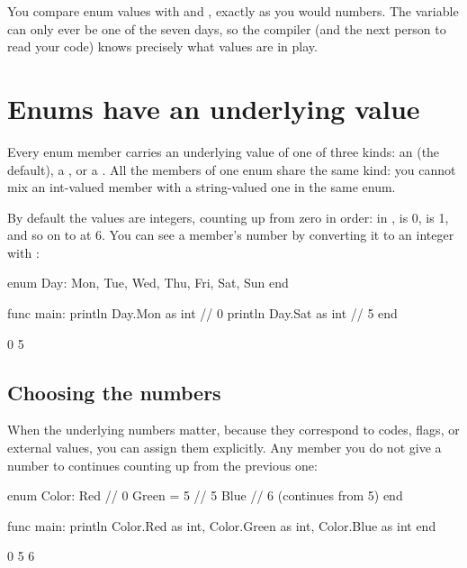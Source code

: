 You compare enum values with \code{==} and \code{!=}, exactly as you would
numbers. The variable  can only ever be one of the seven days, so the
compiler (and the next person to read your code) knows precisely what values
are in play.

\section{Enums have an underlying value}

Every enum member carries an underlying value of one of three kinds: an
 (the default), a , or a . All the members of
one enum share the same kind: you cannot mix an int-valued member with a
string-valued one in the same enum.

By default the values are integers, counting up from zero in order: in
,  is 0,  is 1, and so on to  at 6. You
can see a member's number by converting it to an integer with :

\begin{salamen}
enum Day: Mon, Tue, Wed, Thu, Fri, Sat, Sun end

func main:
    println Day.Mon as int      // 0
    println Day.Sat as int      // 5
end
\end{salamen}

\begin{progout}
0
5
\end{progout}

\subsection{Choosing the numbers}

When the underlying numbers matter, because they correspond to codes, flags, or
external values, you can assign them explicitly. Any member you do not give a
number to continues counting up from the previous one:

\begin{salamen}
enum Color:
    Red            // 0
    Green = 5      // 5
    Blue           // 6 (continues from 5)
end

func main:
    println Color.Red as int, Color.Green as int, Color.Blue as int
end
\end{salamen}

\begin{progout}
0 5 6
\end{progout}

